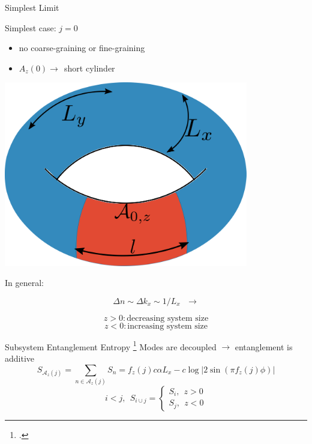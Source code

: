 \documentclass[12pt,aspectratio=169]{beamer}
\begin{document}
\begin{frame}{Simplest Limit}
\hspace*{\fill}
\begin{minipage}{0.5\textwidth}
Simplest case: \(j=0\)\\[5pt]
\begin{itemize}
	\item no coarse-graining or fine-graining\\[20pt]
	\item \(A_z(0) \longrightarrow ~ ~\)\alert{short cylinder}
\end{itemize}
\end{minipage}
\hspace*{\fill}
\begin{minipage}{0.4\textwidth}
	\includegraphics[width=0.8\textwidth]{figures/A_m1.pdf}
\end{minipage}

\vspace*{\fill}
\centering
In general:

\begin{minipage}{0.33\textwidth}
	\[\Delta n \sim \Delta k_x \sim 1/L_x ~ ~ ~\longrightarrow \]
\end{minipage}
\begin{minipage}{0.33\textwidth}
	\[ z > 0: \text{decreasing system size}\]
	\[ z < 0: \text{increasing system size}\]
\end{minipage}
\end{frame}

\begin{frame}{Subsystem Entanglement Entropy}
\footcite{Calabrese_2004,Casini_2005,Arias_2015,Chen_2017,Murciano_2020}
Modes are decoupled \(\longrightarrow\) entanglement is additive
\vspace*{\fill}
\[S_{\mathcal{A}_z(j)} = \sum_{n \in \mathcal{A}_z(j)} S_n = f_z(j) c \alpha L_x - c \log \big|2\sin\left(\pi f_z(j)\phi\right)\big|\]
\[i < j, ~ ~ S_{i\cup j} =
	\begin{cases}
	S_{i}, ~ ~ z > 0\\
	S_{j}, ~ ~ z < 0
	\end{cases}
\]
\end{frame}
\end{document}
